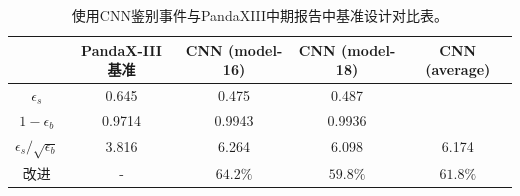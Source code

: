 \begin{table}[hbt]
    \centering
    \caption{使用CNN鉴别事件与PandaXIII中期报告中基准设计对比表。}
    \begin{tabular}{ccccc}
      \\\hline
      & PandaX-III 基准 & CNN (model-16) & CNN (model-18) & CNN (average) \\\hline
      $\epsilon_{s}$ & 0.645 & 0.475  & 0.487 & \\
      $ 1-\epsilon_{b}$ & 0.9714 & 0.9943  & 0.9936 &\\
      $\epsilon_{s}/\sqrt{\epsilon_{b}}$ & 3.816 & 6.264 & 6.098 & 6.174 \\\hline
      改进 & - & $64.2\%$ & $59.8\%$ & $61.8\%$\\\hline
    \end{tabular}
    \label{tab:comparison}
  \end{table}
  

